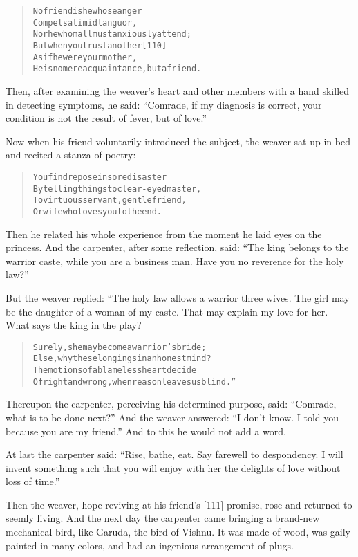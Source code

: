 \documentclass[article, twoside, 14pt]{memoir}
\renewenvironment{verbatim}{%
\begin{quote}%
\vskip -10pt%
\begin{alltt}\normalfont\large}{\end{alltt}%
\end{quote}%
\vskip -10pt
} %
\begin{document}
\begin{verbatim}
No friend is he whose anger
Compels a timid languor,
    Nor he whom all must anxiously attend;
But when you trust another                              [110]
As if he were your mother,
    He is no mere acquaintance, but a friend.
\end{verbatim}
Then, after examining the weaver's heart and other members with a
hand skilled in detecting symptoms, he said:
``Comrade, if my diagnosis is correct, your condition is not the result of fever, but of love.''

Now when his friend voluntarily introduced the subject, the weaver
sat up in bed and recited a stanza of poetry:

\begin{verbatim}
You find repose in sore disaster
By telling things to clear-eyed master,
To virtuous servant, gentle friend,
Or wife who loves you to the end.
\end{verbatim}
Then he related his whole experience from the moment he laid eyes
on the princess. And the carpenter, after some reflection, said:
``The king belongs to the warrior caste, while you are a business man. Have you no reverence for the holy law?''

But the weaver replied: “The holy law allows a warrior three wives.
The girl may be the daughter of a woman of my caste. That may
explain my love for her. What says the king in the play?

\begin{verbatim}
Surely, she may become a warrior's bride;
    Else, why these longings in an honest mind?
The motions of a blameless heart decide
    Of right and wrong, when reason leaves us blind.”
\end{verbatim}
Thereupon the carpenter, perceiving his determined purpose, said:
``Comrade, what is to be done next?'' And the weaver answered:
``I don't know. I told you because you are my friend.'' And to this
he would not add a word.

At last the carpenter said:
``Rise, bathe, eat. Say farewell to despondency. I will invent something such that you will enjoy with her the delights of love without loss of time.''

Then the weaver, hope reviving at his friend's [111] promise, rose
and returned to seemly living. And the next day the carpenter came
bringing a brand-new mechanical bird, like Garuda, the bird of
Vishnu. It was made of wood, was gaily painted in many colors, and
had an ingenious arrangement of plugs.
\end{document}
